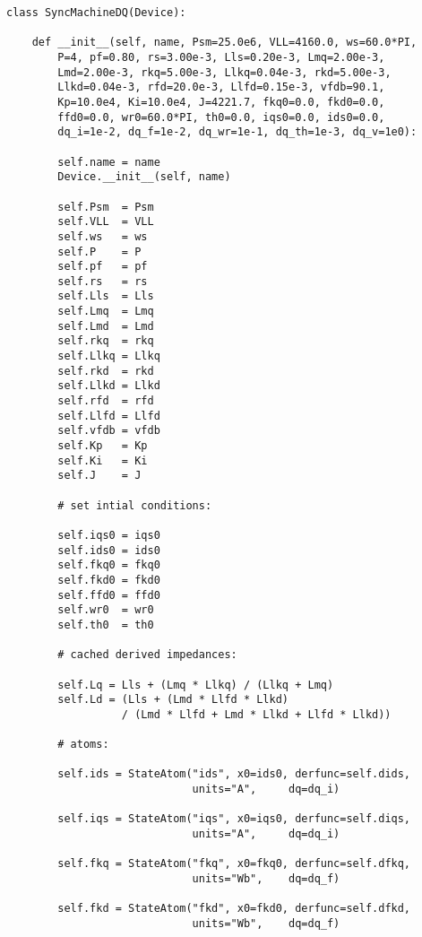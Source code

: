 \begin{lstlisting}
class SyncMachineDQ(Device):

    def __init__(self, name, Psm=25.0e6, VLL=4160.0, ws=60.0*PI,
        P=4, pf=0.80, rs=3.00e-3, Lls=0.20e-3, Lmq=2.00e-3,
        Lmd=2.00e-3, rkq=5.00e-3, Llkq=0.04e-3, rkd=5.00e-3,
        Llkd=0.04e-3, rfd=20.0e-3, Llfd=0.15e-3, vfdb=90.1,
        Kp=10.0e4, Ki=10.0e4, J=4221.7, fkq0=0.0, fkd0=0.0,
        ffd0=0.0, wr0=60.0*PI, th0=0.0, iqs0=0.0, ids0=0.0,
        dq_i=1e-2, dq_f=1e-2, dq_wr=1e-1, dq_th=1e-3, dq_v=1e0):
        
        self.name = name  
        Device.__init__(self, name)
        
        self.Psm  = Psm
        self.VLL  = VLL
        self.ws   = ws
        self.P    = P
        self.pf   = pf
        self.rs   = rs
        self.Lls  = Lls
        self.Lmq  = Lmq
        self.Lmd  = Lmd
        self.rkq  = rkq
        self.Llkq = Llkq
        self.rkd  = rkd
        self.Llkd = Llkd
        self.rfd  = rfd
        self.Llfd = Llfd
        self.vfdb = vfdb
        self.Kp   = Kp
        self.Ki   = Ki
        self.J    = J
        
        # set intial conditions:
        
        self.iqs0 = iqs0
        self.ids0 = ids0
        self.fkq0 = fkq0
        self.fkd0 = fkd0
        self.ffd0 = ffd0
        self.wr0  = wr0
        self.th0  = th0 
        
        # cached derived impedances:
        
        self.Lq = Lls + (Lmq * Llkq) / (Llkq + Lmq)
        self.Ld = (Lls + (Lmd * Llfd * Llkd) 
                  / (Lmd * Llfd + Lmd * Llkd + Llfd * Llkd))
        
        # atoms:
        
        self.ids = StateAtom("ids", x0=ids0, derfunc=self.dids,
                             units="A",     dq=dq_i)
                             
        self.iqs = StateAtom("iqs", x0=iqs0, derfunc=self.diqs, 
                             units="A",     dq=dq_i)
                             
        self.fkq = StateAtom("fkq", x0=fkq0, derfunc=self.dfkq, 
                             units="Wb",    dq=dq_f)
                             
        self.fkd = StateAtom("fkd", x0=fkd0, derfunc=self.dfkd, 
                             units="Wb",    dq=dq_f)
                             

\end{lstlisting}
